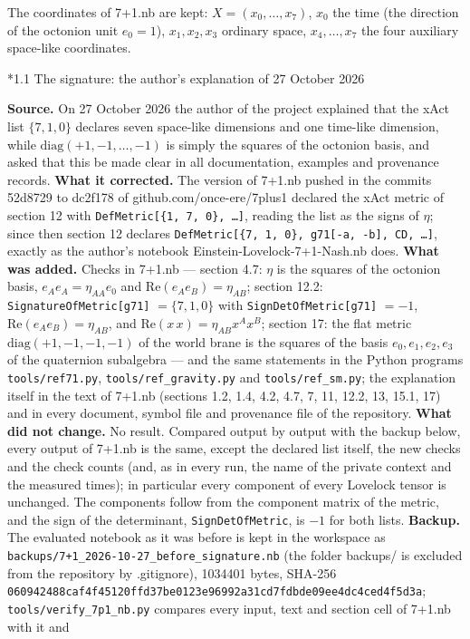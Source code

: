 \documentclass[10pt,a4paper]{article}
\makeatletter
\renewcommand\subsection{\@startsection{subsection}{2}{\z@}{-3.25ex\@plus -1ex \@minus -.2ex}{1.5ex \@plus .2ex}{\normalfont\large\bfseries\raggedright}}
\makeatother
\begin{document}
The coordinates of 7+1.nb are kept: $X=(x_0,\dots,x_7)$, $x_0$ the time (the direction of the octonion unit $e_0=1$), $x_1,x_2,x_3$ ordinary space, $x_4,\dots,x_7$ the four auxiliary space-like coordinates.

\subsection*{1.1 The signature: the author’s explanation of 27 October 2026}
\textbf{Source.} On 27 October 2026 the author of the project explained that the xAct list $\{7,1,0\}$ declares seven space-like dimensions and one time-like dimension, while $\mathrm{diag}(+1,-1,\dots,-1)$ is simply the squares of the octonion basis, and asked that this be made clear in all documentation, examples and provenance records. \textbf{What it corrected.} The version of 7+1.nb pushed in the commits 52d8729 to dc2f178 of github.com/once-ere/7plus1 declared the xAct metric of section 12 with \texttt{DefMetric[\{1, 7, 0\}, …]}, reading the list as the signs of $\eta$; since then section 12 declares \texttt{DefMetric[\{7, 1, 0\}, g71[-a, -b], CD, …]}, exactly as the author’s notebook Einstein-Lovelock-7+1-Nash.nb does. \textbf{What was added.} Checks in 7+1.nb — section 4.7: $\eta$ is the squares of the octonion basis, $e_Ae_A=\eta_{AA}e_0$ and $\mathrm{Re}(e_Ae_B)=\eta_{AB}$; section 12.2: \texttt{SignatureOfMetric[g71]} $=\{7,1,0\}$ with \texttt{SignDetOfMetric[g71]} $=-1$, $\mathrm{Re}(e_Ae_B)=\eta_{AB}$, and $\mathrm{Re}(x\,x)=\eta_{AB}x^Ax^B$; section 17: the flat metric $\mathrm{diag}(+1,-1,-1,-1)$ of the world brane is the squares of the basis $e_0,e_1,e_2,e_3$ of the quaternion subalgebra — and the same statements in the Python programs \texttt{tools/\allowbreak{}ref71.py}, \texttt{tools/\allowbreak{}ref\_\allowbreak{}gravity.py} and \texttt{tools/\allowbreak{}ref\_\allowbreak{}sm.py}; the explanation itself in the text of 7+1.nb (sections 1.2, 1.4, 4.2, 4.7, 7, 11, 12.2, 13, 15.1, 17) and in every document, symbol file and provenance file of the repository. \textbf{What did not change.} No result. Compared output by output with the backup below, every output of 7+1.nb is the same, except the declared list itself, the new checks and the check counts (and, as in every run, the name of the private context and the measured times); in particular every component of every Lovelock tensor is unchanged. The components follow from the component matrix of the metric, and the sign of the determinant, \texttt{SignDetOfMetric}, is $-1$ for both lists. \textbf{Backup.} The evaluated notebook as it was before is kept in the workspace as \texttt{backups/\allowbreak{}7+1\_\allowbreak{}2026-10-27\_\allowbreak{}before\_\allowbreak{}signature.nb} (the folder backups/ is excluded from the repository by .gitignore), 1034401 bytes, SHA-256 \texttt{06094248\allowbreak{}8caf4f45\allowbreak{}120ffd37\allowbreak{}be0123e9\allowbreak{}6992a31c\allowbreak{}d7fdbde0\allowbreak{}9ee4dc4c\allowbreak{}ed4f5d3a}; \texttt{tools/\allowbreak{}verify\_\allowbreak{}7p1\_\allowbreak{}nb.py} compares every input, text and section cell of 7+1.nb with it and 
\end{document}
